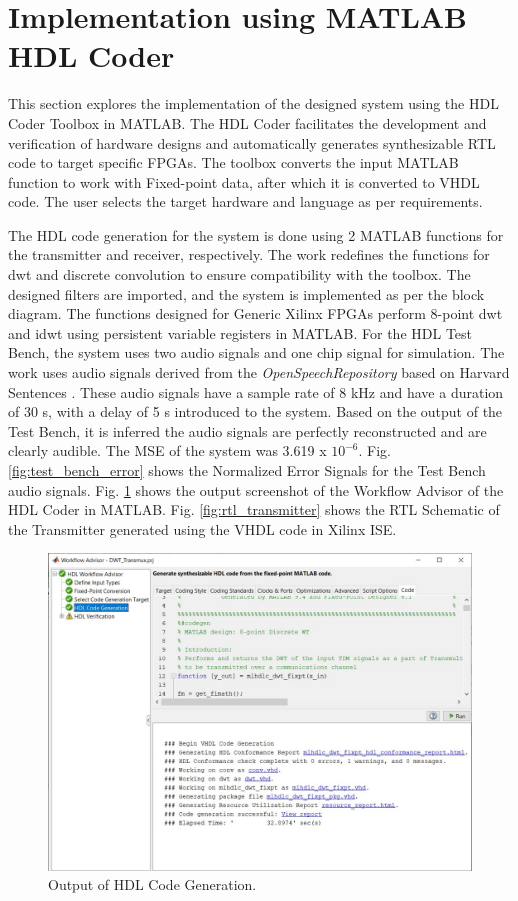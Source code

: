 \section{Implementation using MATLAB HDL Coder}
This section explores the implementation of the designed system using the HDL Coder Toolbox in MATLAB. The HDL Coder facilitates the development and verification of hardware designs and automatically generates synthesizable RTL code to target specific FPGAs. The toolbox converts the input MATLAB function to work with Fixed-point data, after which it is converted to VHDL code. The user selects the target hardware and language as per requirements. \par
The HDL code generation for the system is done using 2 MATLAB functions for the transmitter and receiver, respectively. The work redefines the functions for dwt \cite{dwt} and discrete convolution to ensure compatibility with the toolbox. The designed filters are imported, and the system is implemented as per the block diagram. The functions designed for Generic Xilinx FPGAs perform 8-point dwt and idwt using persistent variable registers in MATLAB. For the HDL Test Bench, the system uses two audio signals and one chip signal for simulation. The work uses audio signals derived from the \textit{OpenSpeechRepository} based on Harvard Sentences \cite{speech}. These audio signals have a sample rate of 8 kHz and have a duration of 30 s, with a delay of 5 s introduced to the system. Based on the output of the Test Bench, it is inferred the audio signals are perfectly reconstructed and are clearly audible. The MSE of the system was 3.619 x $10^{-6}$. Fig. \ref{fig:test_bench_error} shows the Normalized Error Signals for the Test Bench audio signals. Fig. \ref{fig:hdl} shows the output screenshot of the Workflow Advisor of the HDL Coder in MATLAB. Fig. \ref{fig:rtl_transmitter} shows the RTL Schematic of the Transmitter generated using the VHDL code in Xilinx ISE.

\begin{figure}[htpb]
    \centering
    \includegraphics[width=170mm]{HDL_Coder.jpg}
    \caption{Output of HDL Code Generation.}
    \label{fig:hdl}
\end{figure}

